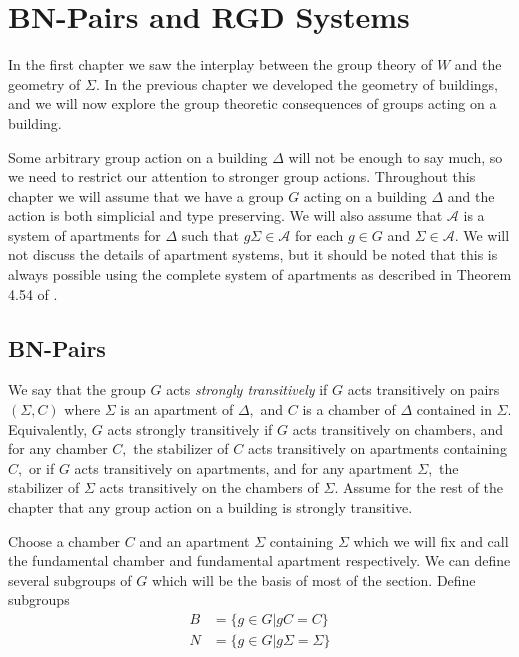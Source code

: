 \documentclass[class=book, crop=false,12 pt]{standalone}
\begin{document}
\chapter{BN-Pairs and RGD Systems}
\label{ch:rgd}
In the first chapter we saw the interplay between the group theory of $W$ and the geometry of $\Sigma.$ In the previous chapter we developed the geometry of buildings, and we will now explore the group theoretic consequences of groups acting on a building. 

Some arbitrary group action on a building $\Delta$ will not be enough to say much, so we need to restrict our attention to stronger group actions. Throughout this chapter we will assume that we have a group $G$ acting on a building $\Delta$ and the action is both simplicial and type preserving. We will also assume that $\mathcal{A}$ is a system of apartments for $\Delta$ such that $g\Sigma\in \mathcal{A}$ for each $g\in G$ and $\Sigma\in \mathcal{A}.$ We will not discuss the details of apartment systems, but it should be noted that this is always possible using the complete system of apartments as described in Theorem 4.54 of \cite{buildings}. 

\section{BN-Pairs}
We say that the group $G$ acts \emph{strongly transitively} if $G$ acts transitively on pairs $(\Sigma,C)$ where $\Sigma$ is an apartment of $\Delta,$ and $C$ is a chamber of $\Delta$ contained in $\Sigma.$ Equivalently, $G$ acts strongly transitively if $G$ acts transitively on chambers, and for any chamber $C,$ the stabilizer of $C$ acts transitively on apartments containing $C,$ or if $G$ acts transitively on apartments, and for any apartment $\Sigma,$ the stabilizer of $\Sigma$ acts transitively on the chambers of $\Sigma.$ Assume for the rest of the chapter that any group action on a building is strongly transitive.

Choose a chamber $C$ and an apartment $\Sigma$ containing $\Sigma$ which we will fix and call the fundamental chamber and fundamental apartment respectively. We can define several subgroups of $G$ which will be the basis of most of the section. Define subgroups
\begin{align*}
	B&=\{g\in G|gC=C\}\\
	N&=\{g\in G|g\Sigma=\Sigma\}
\end{align*}
\end{document}
